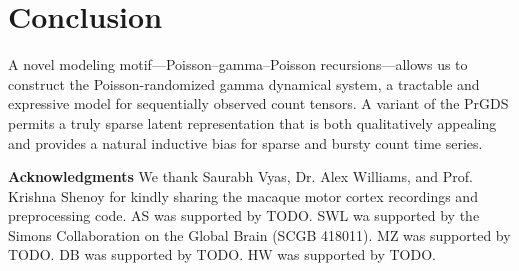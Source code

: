 \documentclass{article}
\begin{document}
\section{Conclusion} A novel modeling motif---Poisson--gamma--Poisson recursions---allows us to construct the Poisson-randomized gamma dynamical system, a tractable and expressive model for sequentially observed count tensors. A variant of the PrGDS permits a truly sparse latent representation that is both qualitatively appealing and provides a natural inductive bias for sparse and bursty count time series.


{\small
  \textbf{Acknowledgments} \;
  We thank Saurabh Vyas, Dr. Alex Williams, and Prof. Krishna Shenoy for kindly sharing the macaque motor cortex recordings and preprocessing code.  AS was supported by TODO. SWL wa supported by the Simons Collaboration on the Global Brain (SCGB 418011).  MZ was supported by TODO.  DB was supported by TODO.  HW was supported by TODO.
  }

\end{document}
